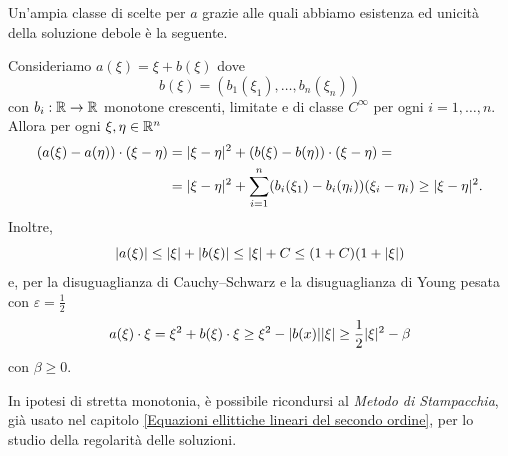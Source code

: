 Un'ampia classe di scelte per $a$ grazie alle quali abbiamo esistenza ed unicità della soluzione debole è la seguente.
\begin{esempio}
	Consideriamo $a(\xi) = \xi +b(\xi)$ dove 
	\[ b(\xi) = (b_1(\xi_1),\dots,b_n(\xi_n)) \]
	con $b_i : \mathbb{R}\to \mathbb{R}$ monotone crescenti, limitate e di classe $C^\infty$ per ogni $i=1,\dots,n$. Allora per ogni $\xi,\eta \in \mathbb{R}^n$
	\begin{align*}
		(a(\xi)-a(\eta))\cdot (\xi-\eta) &= \lvert\xi-\eta\rvert^2 +(b(\xi)-b(\eta))\cdot(\xi-\eta) = \\
		&=\lvert\xi-\eta\rvert^2 + \sum_{i=1}^{n}(b_i(\xi_1)-b_i(\eta_i))(\xi_i-\eta_i) \ge \lvert\xi-\eta\rvert^2.
	\end{align*}
	Inoltre,
	\[ \lvert a(\xi)\rvert \le \lvert\xi\rvert + \lvert b(\xi)\rvert \le \lvert\xi\rvert + C \le (1+C)(1+\lvert\xi\rvert)\]
	e, per la disuguaglianza di Cauchy--Schwarz e la disuguaglianza di Young pesata con $\varepsilon = \frac{1}{2}$
	\[ a(\xi) \cdot \xi = \xi^2 + b(\xi) \cdot \xi \ge \xi^2 -\lvert b(x)\rvert \lvert\xi\rvert \ge  \frac{1}{2} \lvert\xi\rvert^2 - \beta\]
	con $\beta \ge 0$.
\end{esempio}
\begin{osservazione}
	In ipotesi di stretta monotonia, è possibile ricondursi al \emph{Metodo di Stampacchia}, già usato nel capitolo \ref{Equazioni ellittiche lineari del secondo ordine}, per lo studio della regolarità delle soluzioni.
\end{osservazione}

